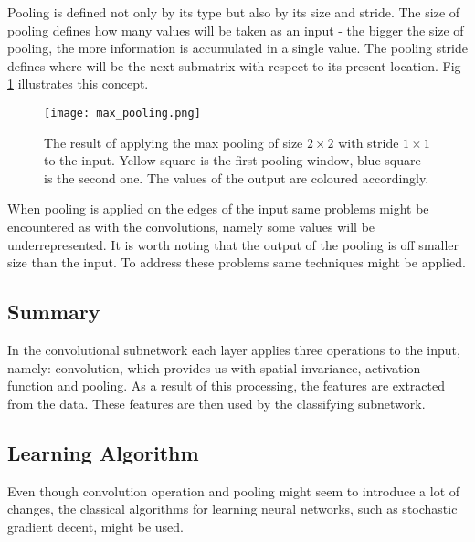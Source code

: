\documentclass[a4paper,10pt]{report}
\begin{document}
	  
	  Pooling is defined not only by its type but also by its size and stride. The size of pooling defines how many values will be taken as an input - the bigger the size of pooling, the more information is accumulated in a single value. The pooling stride defines where will be the next submatrix with respect to its present location. Fig \ref{fig:max_pooling} illustrates this concept.\\
	  
	  \begin{figure}[h!]
	    \centering
	    \texttt{[image: max\_pooling.png]}
	    \caption{The result of applying the max pooling of size $2\times2$ with stride $1\times1$ to the input. Yellow square is the first pooling window, blue square is the second one. The values of the output are coloured accordingly.}
	    \label{fig:max_pooling}
	  \end{figure} 
  
	  When pooling is applied on the edges of the input same problems might be encountered as with the convolutions, namely some values will be underrepresented. It is worth noting that the output of the pooling is off smaller size than the input. To address these problems same techniques might be applied.\\
	  
	   
	
	\subsection{Summary}
	  In the convolutional subnetwork each layer applies three operations to the input, namely: convolution, which provides us with spatial invariance, activation function and pooling. As a result of this processing, the features are extracted from the data. These features are then used by the classifying subnetwork.\\
	  	  
      
      
      \subsection{Learning Algorithm}
      Even though convolution operation and pooling might seem to introduce a lot of changes, the classical algorithms for learning neural networks, such as stochastic gradient decent, might be used.    
	
\end{document}
